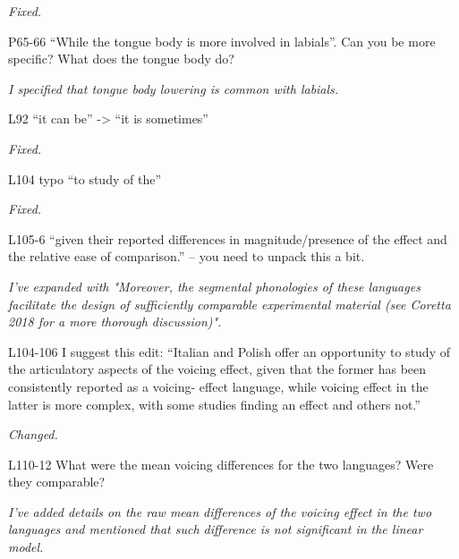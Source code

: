\documentclass[]{article}
\begin{document}
\begin{adjustwidth}{1cm}{} \textit{
Fixed.
} \end{adjustwidth}

P65-66 ``While the tongue body is more involved in labials''. Can you be
more specific? What does the tongue body do?

\begin{adjustwidth}{1cm}{} \textit{
I specified that tongue body lowering is common with labials.
} \end{adjustwidth}

L92 ``it can be'' -\textgreater{} ``it is sometimes''

\begin{adjustwidth}{1cm}{} \textit{
Fixed.
} \end{adjustwidth}

L104 typo ``to study of the''

\begin{adjustwidth}{1cm}{} \textit{
Fixed.
} \end{adjustwidth}

L105-6 ``given their reported differences in magnitude/presence of the
effect and the relative ease of comparison.'' -- you need to unpack this
a bit.

\begin{adjustwidth}{1cm}{} \textit{
I've expanded with "Moreover, the segmental phonologies of these languages facilitate the design of sufficiently comparable experimental material (see Coretta 2018 for a more thorough discussion)".
} \end{adjustwidth}

L104-106 I suggest this edit: ``Italian and Polish offer an opportunity
to study of the articulatory aspects of the voicing effect, given that
the former has been consistently reported as a voicing- effect language,
while voicing effect in the latter is more complex, with some studies
finding an effect and others not.''

\begin{adjustwidth}{1cm}{} \textit{
Changed.
} \end{adjustwidth}

L110-12 What were the mean voicing differences for the two languages?
Were they comparable?

\begin{adjustwidth}{1cm}{} \textit{
I've added details on the raw mean differences of the voicing effect in the two languages and mentioned that such difference is not significant in the linear model.
} \end{adjustwidth}
\end{document}
